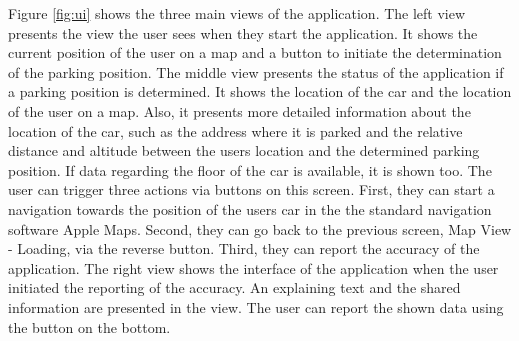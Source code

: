 Figure \ref{fig:ui} shows the three main views of the application. The left view presents the view the user sees when they start the application. It shows the current position of the user on a map and a button to initiate the determination of the parking position. The middle view presents the status of the application if a parking position is determined. It shows the location of the car and the location of the user on a map. Also, it presents more detailed information about the location of the car, such as the address where it is parked and the relative distance and altitude between the users location and the determined parking position. If data regarding the floor of the car is available, it is shown too. The user can trigger three actions via buttons on this screen. First, they can start a navigation towards the position of the users car in the the standard navigation software Apple Maps. Second, they can go back to the previous screen, Map View - Loading, via the reverse button. Third, they can report the accuracy of the application. The right view shows the interface of the application when the user initiated the reporting of the accuracy. An explaining text and the shared information are presented in the view. The user can report the shown data using the button on the bottom. 

